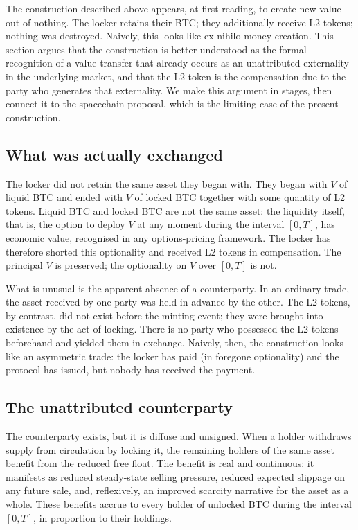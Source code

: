 \documentclass[11pt,a4paper]{article}
\begin{document}
The construction described above appears, at first reading, to create new value out of nothing. The locker retains their BTC; they additionally receive L2 tokens; nothing was destroyed. Naively, this looks like ex-nihilo money creation. This section argues that the construction is better understood as the formal recognition of a value transfer that already occurs as an unattributed externality in the underlying market, and that the L2 token is the compensation due to the party who generates that externality. We make this argument in stages, then connect it to the spacechain proposal, which is the limiting case of the present construction.

\subsection{What was actually exchanged}

The locker did not retain the same asset they began with. They began with $V$ of liquid BTC and ended with $V$ of locked BTC together with some quantity of L2 tokens. Liquid BTC and locked BTC are not the same asset: the liquidity itself, that is, the option to deploy $V$ at any moment during the interval $[0, T]$, has economic value, recognised in any options-pricing framework. The locker has therefore shorted this optionality and received L2 tokens in compensation. The principal $V$ is preserved; the optionality on $V$ over $[0, T]$ is not.

What is unusual is the apparent absence of a counterparty. In an ordinary trade, the asset received by one party was held in advance by the other. The L2 tokens, by contrast, did not exist before the minting event; they were brought into existence by the act of locking. There is no party who possessed the L2 tokens beforehand and yielded them in exchange. Naively, then, the construction looks like an asymmetric trade: the locker has paid (in foregone optionality) and the protocol has issued, but nobody has received the payment.

\subsection{The unattributed counterparty}

The counterparty exists, but it is diffuse and unsigned. When a holder withdraws supply from circulation by locking it, the remaining holders of the same asset benefit from the reduced free float. The benefit is real and continuous: it manifests as reduced steady-state selling pressure, reduced expected slippage on any future sale, and, reflexively, an improved scarcity narrative for the asset as a whole. These benefits accrue to every holder of unlocked BTC during the interval $[0, T]$, in proportion to their holdings.
\end{document}
